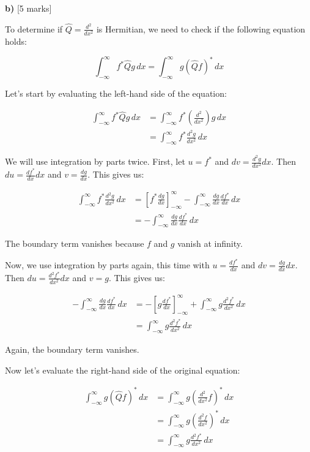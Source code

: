 \documentclass{article}
\begin{document}
\textbf{b)} [5 marks]

To determine if $\hat{Q} = \frac{d^2}{dx^2}$ is Hermitian, we need to check if the following equation holds:

\begin{equation*}
\int_{-\infty}^{\infty} f^* \hat{Q} g \, dx = \int_{-\infty}^{\infty} g (\hat{Q} f)^* \, dx
\end{equation*}

Let's start by evaluating the left-hand side of the equation:

\begin{align*}
\int_{-\infty}^{\infty} f^* \hat{Q} g \, dx &= \int_{-\infty}^{\infty} f^* \left( \frac{d^2}{dx^2} \right) g \, dx \\
&= \int_{-\infty}^{\infty} f^* \frac{d^2g}{dx^2} \, dx
\end{align*}

We will use integration by parts twice. First, let $u = f^*$ and $dv = \frac{d^2g}{dx^2} dx$. Then $du = \frac{df^*}{dx} dx$ and $v = \frac{dg}{dx}$.  This gives us:

\begin{align*}
\int_{-\infty}^{\infty} f^* \frac{d^2g}{dx^2} \, dx &= \left[ f^* \frac{dg}{dx} \right]_{-\infty}^{\infty} - \int_{-\infty}^{\infty} \frac{dg}{dx} \frac{df^*}{dx} \, dx \\
&= - \int_{-\infty}^{\infty} \frac{dg}{dx} \frac{df^*}{dx} \, dx
\end{align*}

The boundary term vanishes because $f$ and $g$ vanish at infinity.

Now, we use integration by parts again, this time with $u = \frac{df^*}{dx}$ and $dv = \frac{dg}{dx} dx$. Then $du = \frac{d^2f^*}{dx^2} dx$ and $v = g$.  This gives us:

\begin{align*}
- \int_{-\infty}^{\infty} \frac{dg}{dx} \frac{df^*}{dx} \, dx &= -\left[ g \frac{df^*}{dx} \right]_{-\infty}^{\infty} + \int_{-\infty}^{\infty} g \frac{d^2f^*}{dx^2} \, dx \\
&= \int_{-\infty}^{\infty} g \frac{d^2f^*}{dx^2} \, dx
\end{align*}

Again, the boundary term vanishes.

Now let's evaluate the right-hand side of the original equation:

\begin{align*}
\int_{-\infty}^{\infty} g (\hat{Q} f)^* \, dx &= \int_{-\infty}^{\infty} g \left( \frac{d^2}{dx^2} f \right)^* \, dx \\
&= \int_{-\infty}^{\infty} g \left( \frac{d^2f}{dx^2} \right)^* \, dx \\
&= \int_{-\infty}^{\infty} g \frac{d^2f^*}{dx^2} \, dx 
\end{align*}
\end{document}
